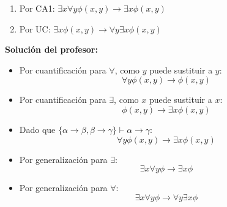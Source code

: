 \begin{problem}
\spart

\begin{enumerate}
\item Por CA1: $\exists x \forall y \phi (x,y) \to \exists x \phi (x,y)$
\item Por UC: $ \exists x \phi (x,y) \to \forall y \exists x \phi (x,y)$


\end{enumerate}

\spart


\textbf{Solución del profesor:}

\begin{itemize}
	\item Por cuantificación para $\forall$, como $y$ puede sustituir a $y$:
	$$\forall y \phi(x,y) \to \phi(x,y)$$
	\item Por cuantificación para $\exists$, como $x$ puede sustituir a $x$:
	$$\phi(x,y)\to \exists x\phi(x,y)$$
	\item Dado que $\{\alpha\to \beta, \beta\to \gamma \}\vdash \alpha \to \gamma$:
	$$\forall y \phi(x,y) \to \exists x \phi(x,y)$$
	\item Por generalización para $\exists$:
	$$\exists x \forall y \phi \to \exists x \phi$$
	\item Por generalización para $\forall$:
	$$\exists x \forall y \phi \to \forall y \exists x \phi$$
\end{itemize}


\end{problem}

